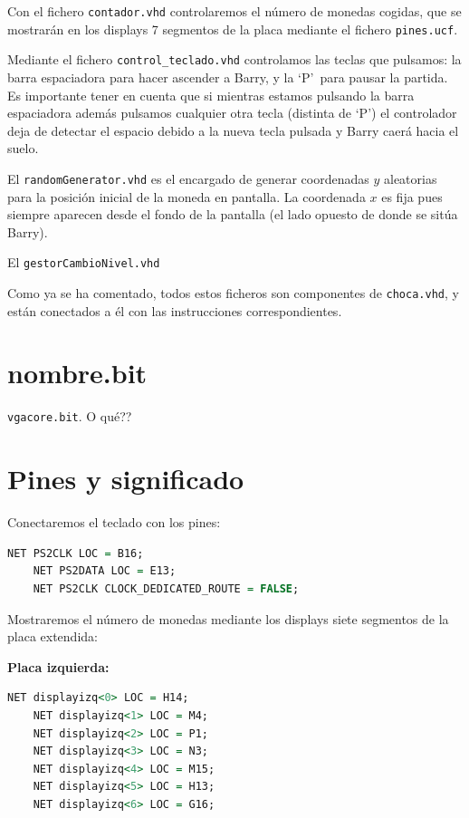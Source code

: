 \documentclass[11pt, a4paper, spanish, openright, twoside]{book}
\begin{document}
Con el fichero \texttt{contador.vhd} controlaremos el número de monedas cogidas, que se mostrarán en los displays 7 segmentos de la placa mediante el fichero \texttt{pines.ucf}.

Mediante el fichero \texttt{control\_teclado.vhd} controlamos las teclas que pulsamos: la barra espaciadora para hacer ascender a Barry, y la `P'\ para pausar la partida. Es importante tener en cuenta que si mientras estamos pulsando la barra espaciadora además pulsamos cualquier otra tecla (distinta de `P') el controlador deja de detectar el espacio debido a la nueva tecla pulsada y Barry caerá hacia el suelo.

El \texttt{randomGenerator.vhd} es el encargado de generar coordenadas $y$ aleatorias para la posición inicial de la moneda en pantalla. La coordenada $x$ es fija pues siempre aparecen desde el fondo de la pantalla (el lado opuesto de donde se sitúa Barry).

El \texttt{gestorCambioNivel.vhd}  %

Como ya se ha comentado, todos estos ficheros son componentes de \texttt{choca.vhd}, y están conectados a él con las instrucciones correspondientes.

\section{nombre.bit}

\texttt{vgacore.bit}. O qué??

\section{Pines y significado}
Conectaremos el teclado con los pines:

\begin{lstlisting}[language=VHDL]
	NET PS2CLK LOC = B16;
	NET PS2DATA LOC = E13;
	NET PS2CLK CLOCK_DEDICATED_ROUTE = FALSE;
\end{lstlisting}


Mostraremos el número de monedas mediante los displays siete segmentos de la placa extendida:

\textbf{Placa izquierda:}

\begin{lstlisting}[language=VHDL]
	NET displayizq<0> LOC = H14;
	NET displayizq<1> LOC = M4;
	NET displayizq<2> LOC = P1;
	NET displayizq<3> LOC = N3;
	NET displayizq<4> LOC = M15;
	NET displayizq<5> LOC = H13;
	NET displayizq<6> LOC = G16;
\end{lstlisting}
\end{document}

